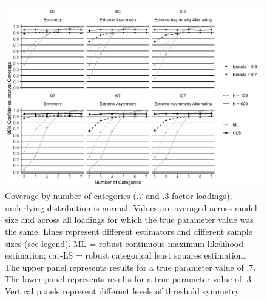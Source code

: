 \documentclass[10,a4paperpaper,]{article}
\begin{document}
\begin{figure}
\includegraphics[width=445pt]{./figures/fig_6} \caption{Coverage by number of categories (.7 and .3 factor loadings); underlying distribution is normal. Values are averaged across model size and across all loadings for which the true parameter value was the same. Lines represent different estimators and different sample sizes (see legend). ML = robust continuous maximum likelihood estimation; cat-LS = robust categorical least squares estimation. The upper panel represents results for a true parameter value of .7. The lower panel represents results for a true parameter value of .3. Vertical panels represent different levels of threshold symmetry}\label{fig:unnamed-chunk-5}
\end{figure}
\end{document}
